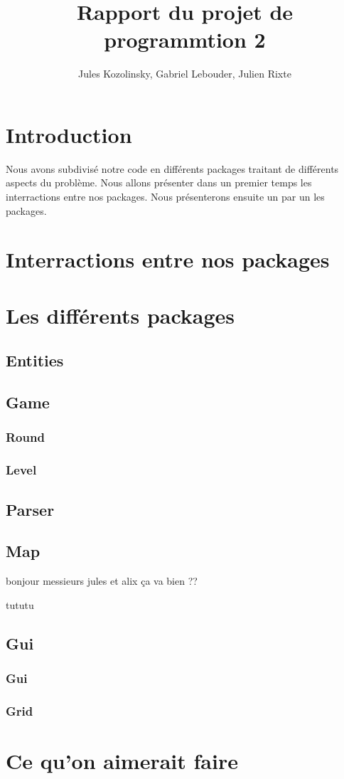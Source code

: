 \documentclass{article}
\title{Rapport du projet de programmtion 2}
\author{Jules Kozolinsky, Gabriel Lebouder, Julien Rixte}
\begin{document}
\maketitle

\section{Introduction}
  Nous avons subdivisé notre code en différents packages traitant de différents aspects du problème.
  Nous allons présenter dans un premier temps les interractions entre nos packages.
  Nous présenterons ensuite un par un les packages.

\section{Interractions entre nos packages}


\section{Les différents packages}

\subsection{Entities}

\subsection{Game}
\subsubsection{Round}
\subsubsection{Level}

\subsection{Parser}

\subsection{Map}
bonjour
messieurs jules et alix ça va bien ??

tututu
\subsection{Gui}
\subsubsection{Gui}
\subsubsection{Grid}

\section{Ce qu'on aimerait faire}
\end{document}
